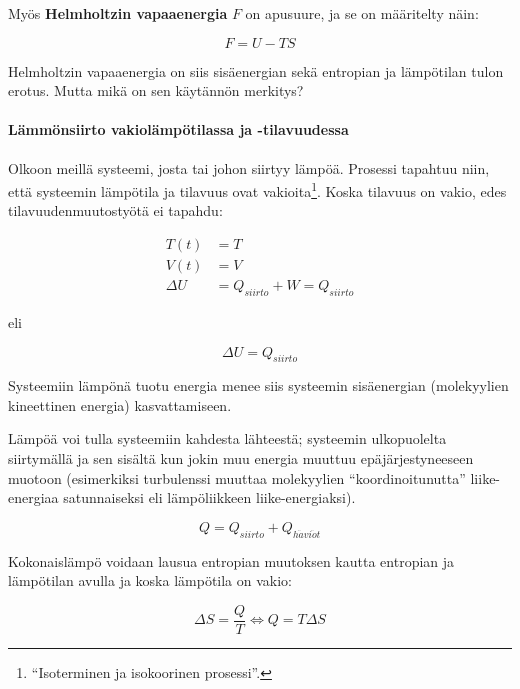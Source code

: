 \documentclass[12pt,a4paper,finnish]{book}
\begin{document}
Myös \textbf{Helmholtzin vapaaenergia} $F$ on apusuure, ja se on määritelty näin:

\begin{equation}
 F = U - TS
\end{equation}

Helmholtzin vapaaenergia on siis sisäenergian sekä entropian ja lämpötilan tulon erotus. Mutta mikä on sen 
käytännön merkitys?

\paragraph{Lämmönsiirto vakiolämpötilassa ja -tilavuudessa}

Olkoon meillä systeemi, josta tai johon siirtyy lämpöä. Prosessi tapahtuu niin, että systeemin lämpötila ja 
tilavuus ovat vakioita\footnote{``Isoterminen ja isokoorinen prosessi''.}. 
Koska tilavuus on vakio, edes tilavuudenmuutostyötä ei tapahdu:

\begin{align}
 T(t) & = T\\
 V(t) & = V\\
 \Delta U & = Q_{siirto} + W = Q_{siirto}
\end{align}

eli 

\begin{equation}
\label{eqn:isoTV}
 \Delta U = Q_{siirto}
\end{equation}

Systeemiin lämpönä tuotu energia menee siis systeemin sisäenergian (molekyylien kineettinen energia) kasvattamiseen.

Lämpöä voi tulla systeemiin kahdesta lähteestä; systeemin ulkopuolelta siirtymällä ja sen sisältä kun jokin muu 
energia muuttuu epäjärjestyneeseen muotoon (esimerkiksi turbulenssi muuttaa molekyylien ``koordinoitunutta'' 
liike-energiaa satunnaiseksi eli lämpöliikkeen liike-energiaksi).

\begin{equation}
\label{eqn:QQQ}
 Q = Q_{siirto} + Q_{h\ddot{a}vi\ddot{o}t}
\end{equation}

Kokonaislämpö voidaan lausua entropian muutoksen kautta entropian ja lämpötilan avulla ja
koska lämpötila on vakio:

\begin{equation}
\label{eqn:DeltaS}
 \Delta S = \frac{Q}{T} \Leftrightarrow Q = T\Delta S
\end{equation}
\end{document}
